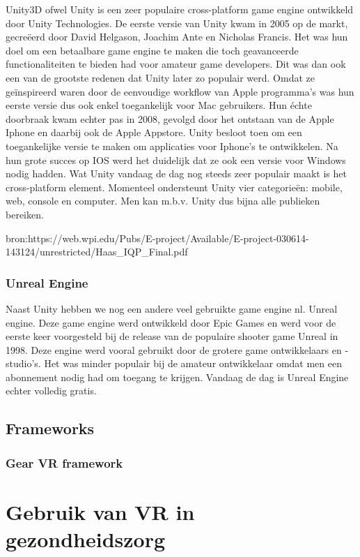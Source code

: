 Unity3D ofwel Unity is een zeer populaire cross-platform game engine ontwikkeld door Unity Technologies.
De eerste versie van Unity kwam in 2005 op de markt, gecreëerd door David Helgason, Joachim Ante en Nicholas Francis. Het was hun doel om een betaalbare game engine te maken die toch geavanceerde functionaliteiten te bieden had voor amateur game developers. Dit was dan ook een van de grootste redenen dat Unity later zo populair werd. Omdat ze geïnspireerd waren door de eenvoudige workflow van Apple programma's was hun eerste versie dus ook enkel toegankelijk voor Mac gebruikers. Hun échte doorbraak kwam echter pas in 2008, gevolgd door het ontstaan van de Apple Iphone en daarbij ook de Apple Appstore. Unity besloot toen om een toegankelijke versie te maken om applicaties voor Iphone's te ontwikkelen. Na hun grote succes op IOS werd het duidelijk dat ze ook een versie voor Windows nodig hadden. Wat Unity vandaag de dag nog steeds zeer populair maakt is het cross-platform element. Momenteel ondersteunt Unity vier categorieën: mobile, web, console en computer. Men kan m.b.v. Unity dus bijna alle publieken bereiken.

bron:https://web.wpi.edu/Pubs/E-project/Available/E-project-030614-143124/unrestricted/Haas\_IQP\_Final.pdf

\subsubsection{Unreal Engine}
Naast Unity hebben we nog een andere veel gebruikte game engine nl. Unreal engine. Deze game engine werd ontwikkeld door Epic Games en werd voor de eerste keer voorgesteld bij de release van de populaire shooter game Unreal in 1998. Deze engine werd vooral gebruikt door de grotere game ontwikkelaars en -studio's. Het was minder populair bij de amateur ontwikkelaar omdat men een abonnement nodig had om toegang te krijgen. Vandaag de dag is Unreal Engine echter volledig gratis.

\subsection{Frameworks}
\subsubsection{Gear VR framework}

\section{Gebruik van VR in gezondheidszorg}

